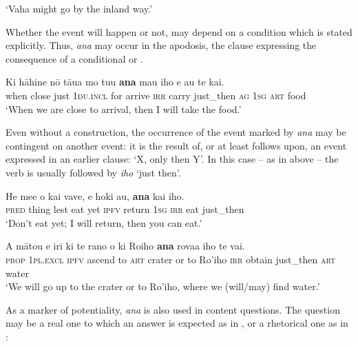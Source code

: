 \glt
‘Vaha might go by the inland way.’ \textstyleExampleref{[Mtx-3-01.142]}
\z

Whether the event will happen or not, may depend on a condition which is stated explicitly. Thus, \textit{ana} may occur in the apodosis, the clause expressing the consequence of a conditional or . 

\ea\label{ex:11.168}
\gll Ki hāhine nō tāua mo tu{\ꞌ}u \textbf{ana} ma{\ꞌ}u iho e au te kai.\\
when close just \textsc{1du.incl} for arrive \textsc{irr} carry just\_then \textsc{ag} \textsc{1sg} \textsc{art} food\\

\glt
‘When we are close to arrival, then I will take the food.’ \textstyleExampleref{[R215.026]} 
\z

Even without a  construction, the occurrence of the event marked by \textit{ana} may be contingent on another event: it is the result of, or at least follows upon, an event expressed in an earlier clause: ‘X, only then Y’. In this case – as in  above – the verb is usually followed by \textit{iho} ‘just then’. 

\ea\label{ex:11.169}
\gll He me{\ꞌ}e {\ꞌ}o kai vave, e hoki au, \textbf{ana} kai iho. \\
\textsc{pred} thing lest eat yet \textsc{ipfv} return \textsc{1sg} \textsc{irr} eat just\_then \\

\glt 
‘Don’t{\rmfnm} eat yet; I will return, then you can eat.’ \textstyleExampleref{[Mtx-3-01.194]}
\z
{}

\ea\label{ex:11.170}
\gll A mātou e iri ki te rano {\ꞌ}o ki Ro{\ꞌ}iho \textbf{ana} rova{\ꞌ}a iho te vai. \\
\textsc{prop} \textsc{1pl.excl} \textsc{ipfv} ascend to \textsc{art} crater or to Ro’iho \textsc{irr} obtain just\_then \textsc{art} water \\

\glt
‘We will go up to the crater or to Ro’iho, where we (will/may) find water.’ \textstyleExampleref{[R487.035]} 
\z

As a marker of potentiality, \textit{ana} is also used in content questions. The question may be a real one to which an answer is expected as in , or a rhetorical one as in :

